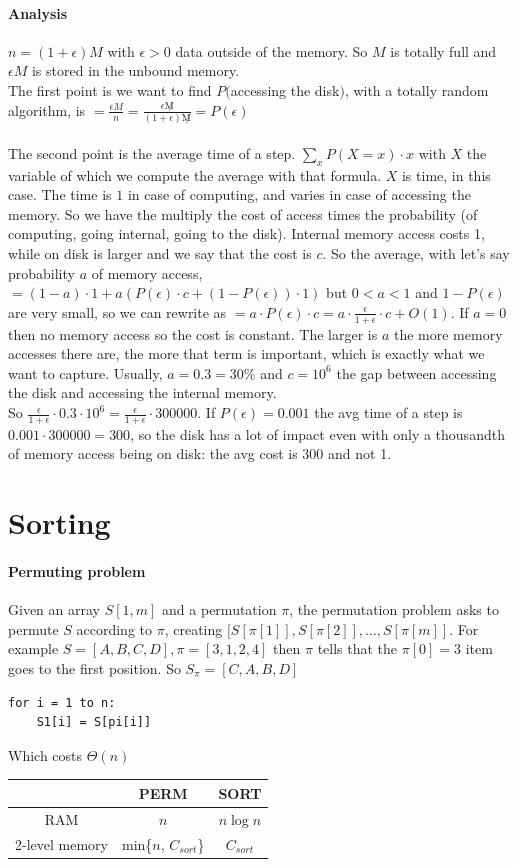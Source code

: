 \documentclass[10pt]{report}
\begin{document}
\paragraph{Analysis}
$n = (1 + \epsilon)M$ with $\epsilon > 0$ data outside of the memory. So $M$ is totally full and $\epsilon M$ is stored in the unbound memory.\\
The first point is we want to find $P($accessing the disk$)$, with a totally random algorithm, is $= \frac{\epsilon M}{n} = \frac{\epsilon\not M}{(1 + \epsilon)\not M} = P(\epsilon)$\\\\
The second point is the average time of a step. $\sum_x P(X = x)\cdot x$ with $X$ the variable of which we compute the average with that formula. $X$ is time, in this case. The time is $1$ in case of computing, and varies in case of accessing the memory. So we have the multiply the cost of access times the probability (of computing, going internal, going to the disk). Internal memory access costs 1, while on disk is larger and we say that the cost is $c$. So the average, with let's say probability $a$ of memory access, $= (1 - a)\cdot 1 + a(P(\epsilon)\cdot c + (1 - P(\epsilon))\cdot 1)$ but $0 < a < 1$ and $1 - P(\epsilon)$ are very small, so we can rewrite as $= a\cdot P(\epsilon)\cdot c = a \cdot \frac{\epsilon}{1 + \epsilon} \cdot c + O(1)$. If $a = 0$ then no memory access so the cost is constant. The larger is $a$ the more memory accesses there are, the more that term is important, which is exactly what we want to capture. Usually, $a = 0.3 = 30\%$ and $c = 10^6$ the gap between accessing the disk and accessing the internal memory.\\
So $\frac{\epsilon}{1 + \epsilon}\cdot 0.3 \cdot 10^6 = \frac{\epsilon}{1 + \epsilon} \cdot 300000$. If $P(\epsilon) = 0.001$ the avg time of a step is $0.001 \cdot 300000 = 300$, so the disk has a lot of impact even with only a thousandth of memory access being on disk: the avg cost is 300 and not 1.
\section{Sorting}
\paragraph{Permuting problem} Given an array $S[1, m]$ and a permutation $\pi$, the permutation problem asks to permute $S$ according to $\pi$, creating $[S[\pi[1]], S[\pi[2]],\ldots,S[\pi[m]]$. For example $S = [A, B, C, D], \pi = [3, 1, 2, 4]$ then $\pi$ tells that the $\pi[0] = 3$ item goes to the first position. So $S_\pi = [C, A, B, D]$
\begin{lstlisting}[style=myPython]
for i = 1 to n:
	S1[i] = S[pi[i]]
\end{lstlisting}
Which costs $\Theta(n)$\\
\begin{tabular}{c | c | c}
 & PERM & SORT \\
\hline
RAM & $n$ & $n\log n$\\
\hline
2-level memory & min\{$n$, $C_{sort}$\} & $C_{sort}$
\end{tabular}
\pagebreak
\end{document}

